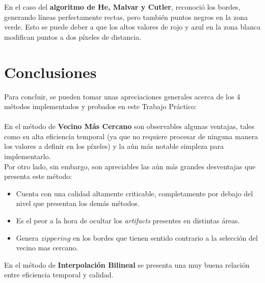 \documentclass[a4paper]{article}
\begin{document}
En el caso del \textbf{algoritmo de He, Malvar y Cutler}, reconoció los bordes, generando líneas perfectamente rectas, pero también puntos negros en la zona verde. Esto se puede deber a que los altos valores de rojo y azul en la zona blanca modifican puntos a dos píxeles de distancia.

\newpage

\section{Conclusiones}
\label{sec:conclusiones}


Para concluir, se pueden tomar unas apreciaciones generales acerca de los 4 métodos implementados y probados en este Trabajo Práctico:\\ \\

En el método de \textbf{Vecino Más Cercano} son observables algunas ventajas, tales como su alta eficiencia temporal (ya que no requiere procesar de ninguna manera los valores a definir en los píxeles) y la aún más notable simpleza para implementarlo.\\
Por otro lado, sin embargo, son apreciables las aún más grandes desventajas que presenta este método:\\
\begin{itemize}

\item Cuenta con una calidad altamente criticable, completamente por debajo del nivel que presentan los demás métodos.

\item Es el peor a la hora de ocultar los \textit{artifacts} presentes en distintas áreas.

\item Genera $zippering$ en los bordes que tienen sentido contrario a la selección del vecino mas cercano.

\end{itemize}

En el método de \textbf{Interpolación Bilineal} se presenta una muy buena relación entre eficiencia temporal y calidad.%
\end{document}
